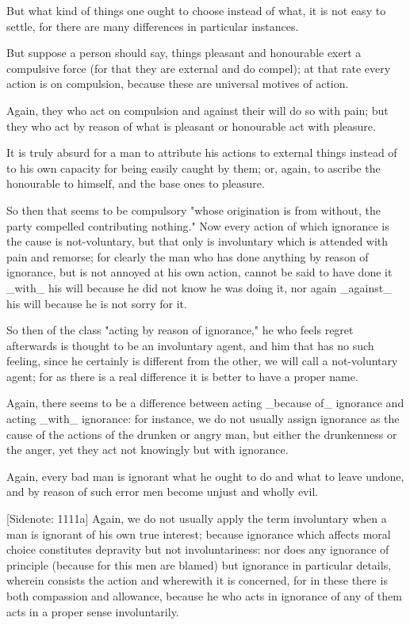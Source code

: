 But what kind of things one ought to choose instead of what, it is not
easy to settle, for there are many differences in particular instances.

But suppose a person should say, things pleasant and honourable exert
a compulsive force (for that they are external and do compel); at that
rate every action is on compulsion, because these are universal motives
of action.

Again, they who act on compulsion and against their will do so with
pain; but they who act by reason of what is pleasant or honourable act
with pleasure.

It is truly absurd for a man to attribute his actions to external things
instead of to his own capacity for being easily caught by them; or,
again, to ascribe the honourable to himself, and the base ones to
pleasure.

So then that seems to be compulsory "whose origination is from without,
the party compelled contributing nothing." Now every action of which
ignorance is the cause is not-voluntary, but that only is involuntary
which is attended with pain and remorse; for clearly the man who has
done anything by reason of ignorance, but is not annoyed at his own
action, cannot be said to have done it _with_ his will because he did
not know he was doing it, nor again _against_ his will because he is not
sorry for it.

So then of the class "acting by reason of ignorance," he who feels
regret afterwards is thought to be an involuntary agent, and him that
has no such feeling, since he certainly is different from the other, we
will call a not-voluntary agent; for as there is a real difference it is
better to have a proper name.

Again, there seems to be a difference between acting _because of_
ignorance and acting _with_ ignorance: for instance, we do not usually
assign ignorance as the cause of the actions of the drunken or angry
man, but either the drunkenness or the anger, yet they act not knowingly
but with ignorance.

Again, every bad man is ignorant what he ought to do and what to leave
undone, and by reason of such error men become unjust and wholly evil.

[Sidenote: 1111a] Again, we do not usually apply the term involuntary
when a man is ignorant of his own true interest; because ignorance which
affects moral choice constitutes depravity but not involuntariness: nor
does any ignorance of principle (because for this men are blamed)
but ignorance in particular details, wherein consists the action and
wherewith it is concerned, for in these there is both compassion and
allowance, because he who acts in ignorance of any of them acts in a
proper sense involuntarily.

